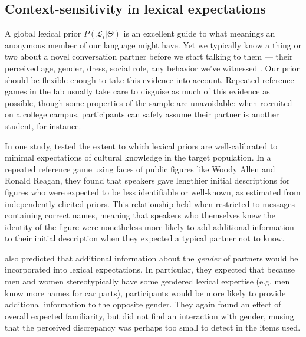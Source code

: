 \documentclass[11pt, floatsintext, jou]{apa6}
\begin{document}
\subsection{Context-sensitivity in lexical expectations}

A global lexical prior $P(\mathcal{L}_i | \Theta)$ is an excellent guide to what meanings an anonymous member of our language might have. Yet we typically know a thing or two about a novel conversation partner before we start talking to them --- their perceived age, gender, dress, social role, any behavior we've witnessed \cite{Davidson86_DerangementOfEpitaphs,KleinschmidtJaeger15_RobustSpeechPerception}. Our prior should be flexible enough to take this evidence into account. Repeated reference games in the lab usually take care to disguise as much of this evidence as possible, though some properties of the sample are unavoidable: when recruited on a college campus, participants can safely assume their partner is another student, for instance. 

In one study,  tested the extent to which lexical priors are well-calibrated to minimal expectations of cultural knowledge in the target population. In a repeated reference game using faces of public figures like Woody Allen and Ronald Reagan, they found that speakers gave lengthier initial descriptions for figures who were expected to be less identifiable or well-known, as estimated from independently elicited priors. This relationship held when restricted to messages containing correct names, meaning that speakers who themselves knew the identity of the figure were nonetheless more likely to add additional information to their initial description when they expected a typical partner not to know. 

 also predicted that additional information about the \emph{gender} of partners would be incorporated into lexical expectations. In particular, they expected that because men and women stereotypically have some gendered lexical expertise (e.g. men know more names for car parts), participants would be more likely to provide additional information to the opposite gender. They again found an effect of overall expected familiarity, but did not find an interaction with gender, musing that the perceived discrepancy was perhaps too small to detect in the items used.
\end{document}
